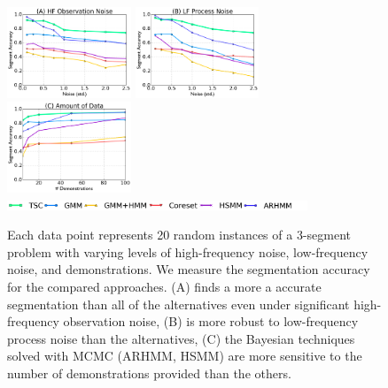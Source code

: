 \begin{figure}
\centering
\includegraphics[width=0.33\textwidth]{tsc-experiments/exp1.png}
\includegraphics[width=0.33\textwidth]{tsc-experiments/exp2.png}
\includegraphics[width=0.33\textwidth]{tsc-experiments/exp5.png}
\includegraphics[width=0.8\textwidth]{tsc-experiments/big-legend.png}
\caption{Each data point represents 20 random instances of a 3-segment problem with varying levels of high-frequency noise, low-frequency noise, and demonstrations. We measure the segmentation accuracy for the compared approaches. (A) \tsc finds a more a accurate segmentation than all of the alternatives even under significant high-frequency observation noise, (B) \tsc is more robust to low-frequency process noise than the alternatives, 
(C) the Bayesian techniques solved with MCMC (ARHMM, HSMM) are more sensitive to the number of demonstrations provided than the others.
\label{exp1}}
\end{figure}

